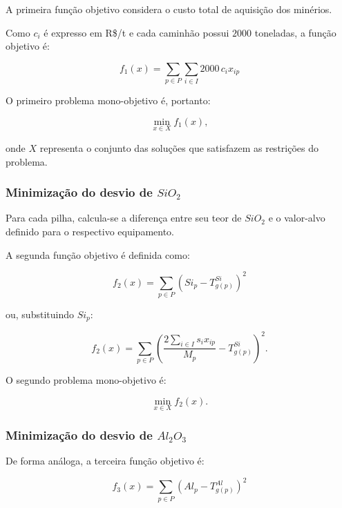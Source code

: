 \documentclass[12pt,a4paper]{article}
\begin{document}
A primeira função objetivo considera o custo total de aquisição dos minérios.

Como $c_i$ é expresso em R\$/t e cada caminhão possui $2000$ toneladas,
a função objetivo é:

\begin{equation}
\boxed{
f_1(x)=
\sum_{p\in P}
\sum_{i\in I}
2000\,c_i x_{ip}
}
\end{equation}

O primeiro problema mono-objetivo é, portanto:

\begin{equation}
\boxed{
\min_{x\in X} f_1(x),
}
\end{equation}

onde $X$ representa o conjunto das soluções que satisfazem as restrições
do problema.


\subsubsection{Minimização do desvio de $SiO_2$}

Para cada pilha, calcula-se a diferença entre seu teor de $SiO_2$ e o
valor-alvo definido para o respectivo equipamento.

A segunda função objetivo é definida como:

\begin{equation}
\boxed{
f_2(x)=
\sum_{p\in P}
\left(
Si_p-T_{g(p)}^{Si}
\right)^2
}
\end{equation}

ou, substituindo $Si_p$:

\begin{equation}
\boxed{
f_2(x)=
\sum_{p\in P}
\left(
\frac{
2\sum_{i\in I}s_i x_{ip}
}{
M_p
}
-
T_{g(p)}^{Si}
\right)^2.
}
\end{equation}

O segundo problema mono-objetivo é:

\begin{equation}
\boxed{
\min_{x\in X} f_2(x).
}
\end{equation}


\subsubsection{Minimização do desvio de $Al_2O_3$}

De forma análoga, a terceira função objetivo é:

\begin{equation}
\boxed{
f_3(x)=
\sum_{p\in P}
\left(
Al_p-T_{g(p)}^{Al}
\right)^2
}
\end{equation}
\end{document}
